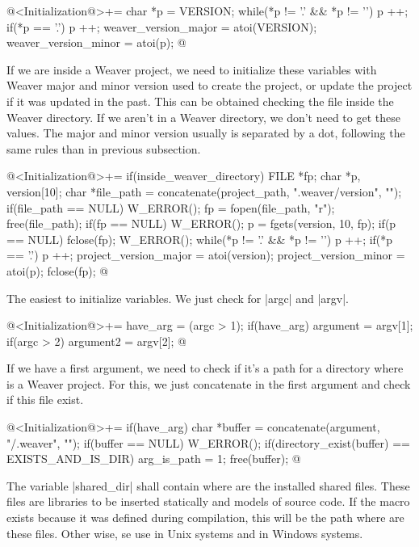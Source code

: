 {\iniciocodigo
@<Initialization@>+=
{
  char *p = VERSION;
  while(*p != '.' && *p != '\0') p ++;
  if(*p == '.') p ++;
  weaver_version_major = atoi(VERSION);
  weaver_version_minor = atoi(p);
}
@
\fimcodigo


If we are inside a Weaver project, we need to initialize these
variables with Weaver major and minor version used to create the
project, or update the project if it was updated in the past. This can
be obtained checking the file  inside the
Weaver directory. If we aren't in a Weaver directory, we don't need to
get these values. The major and minor version usually is separated by
a dot, following the same rules than in previous subsection.

\iniciocodigo
@<Initialization@>+=
if(inside_weaver_directory){
  FILE *fp;
  char *p, version[10];
  char *file_path = concatenate(project_path, ".weaver/version", "");
  if(file_path == NULL) W_ERROR();
  fp = fopen(file_path, "r");
  free(file_path);
  if(fp == NULL) W_ERROR();
  p = fgets(version, 10, fp);
  if(p == NULL){ fclose(fp); W_ERROR(); }
  while(*p != '.' && *p != '\0') p ++;
  if(*p == '.') p ++;
  project_version_major = atoi(version);
  project_version_minor = atoi(p);
  fclose(fp);
}
@
\fimcodigo


The easiest to initialize variables. We just check for |argc| and
|argv|.

\iniciocodigo
@<Initialization@>+=
have_arg = (argc > 1);
if(have_arg) argument = argv[1];
if(argc > 2) argument2 = argv[2];
@
\fimcodigo


If we have a first argument, we need to check if it's a path for a
directory where is a Weaver project. For this, we just
concatenate  in the first argument and check if
this file exist.

\iniciocodigo
@<Initialization@>+=
if(have_arg){
  char *buffer = concatenate(argument, "/.weaver", "");
  if(buffer == NULL) W_ERROR();
  if(directory_exist(buffer) == EXISTS_AND_IS_DIR){
    arg_is_path = 1;
  }
  free(buffer);
}
@
\fimcodigo


The variable |shared_dir| shall contain where are the installed shared
files. These files are libraries to be inserted statically and models
of source code. If the macro  exists because
it was defined during compilation, this will be the path where are
these files. Other wise, se use 
in Unix systems and  in Windows
systems.

}
